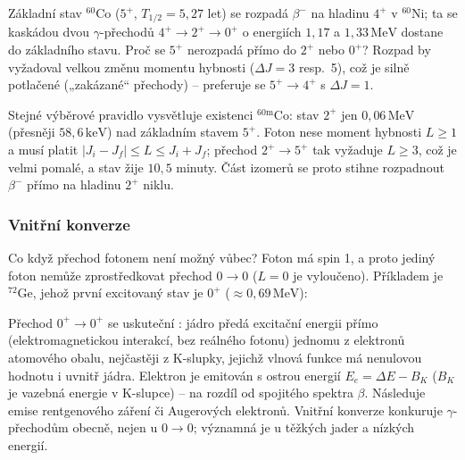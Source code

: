 Základní stav \({}^{60}\mathrm{Co}\) (\(5^+\), \(T_{1/2}=5{,}27\) let) se rozpadá \(\beta^-\) na hladinu \(4^+\) v \({}^{60}\mathrm{Ni}\);
ta se kaskádou dvou \(\gamma\)-přechodů \(4^+\to2^+\to0^+\) o energiích \(1{,}17\) a \(1{,}33\,\mathrm{MeV}\) dostane do základního stavu.
Proč se \(5^+\) nerozpadá přímo do \(2^+\) nebo \(0^+\)? Rozpad by vyžadoval velkou změnu momentu hybnosti (\(\Delta J = 3\) resp.\ 5), což
je silně potlačené („zakázané“ přechody) -- preferuje se \(5^+\to4^+\) s \(\Delta J=1\).

Stejné výběrové pravidlo vysvětluje existenci  \({}^{60\mathrm{m}}\mathrm{Co}\): stav \(2^+\) jen \(0{,}06\,\mathrm{MeV}\)
(přesněji \(58{,}6\,\mathrm{keV}\)) nad základním stavem \(5^+\). Foton nese moment hybnosti \(L\ge1\) a musí platit
\(|J_i-J_f|\le L\le J_i+J_f\); přechod \(2^+\to5^+\) tak vyžaduje \(L\ge3\), což je velmi pomalé, a stav žije \(10{,}5\) minuty. Část izomerů
se proto stihne rozpadnout \(\beta^-\) přímo na hladinu \(2^+\) niklu.

\subsubsection{Vnitřní konverze}

Co když přechod fotonem není možný vůbec? Foton má spin 1, a proto jediný foton nemůže zprostředkovat přechod \(0\to0\)
(\(L=0\) je vyloučeno). Příkladem je \({}^{72}\mathrm{Ge}\), jehož první excitovaný stav je \(0^+\) (\(\approx 0{,}69\,\mathrm{MeV}\)):

\begin{center}
\end{center}

Přechod \(0^+\to0^+\) se uskuteční : jádro předá excitační energii přímo (elektromagnetickou interakcí,
bez reálného fotonu) jednomu z elektronů atomového obalu, nejčastěji z K-slupky, jejichž vlnová funkce má nenulovou hodnotu i uvnitř jádra.
Elektron je emitován s ostrou energií \(E_e = \Delta E - B_K\) (\(B_K\) je vazebná energie v K-slupce) -- na rozdíl od spojitého spektra
\(\beta\). Následuje emise rentgenového záření či Augerových elektronů. Vnitřní konverze konkuruje \(\gamma\)-přechodům obecně, nejen
u \(0\to0\); významná je u těžkých jader a nízkých energií.

